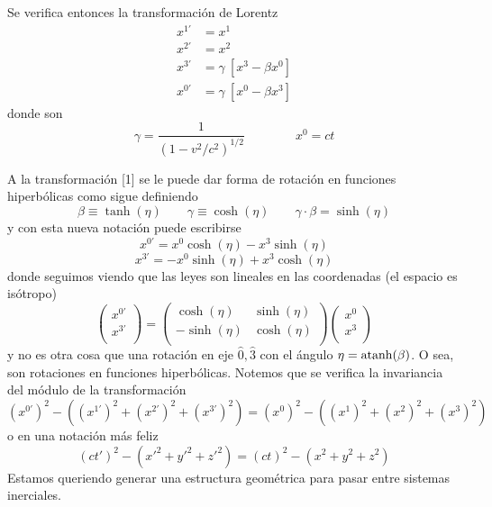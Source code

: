 \documentclass[10pt,oneside]{CBFT_book}
\begin{document}
Se verifica entonces la transformación de Lorentz
\begin{align*}
	x^{1'} &= x^1  \\
	x^{2'} &= x^2  \\
	x^{3'} &= \gamma \: [ x^3 - \beta x^0]  \\
	x^{0'} &= \gamma \: [ x^0 - \beta x^3] 
\end{align*}
donde son 
\[
	\gamma = \frac{1}{(1 - v^2/c^2)^{1/2}} \qquad \qquad x^0 = ct 
\]

A la transformación [1] se le puede dar forma de rotación en funciones hiperbólicas como sigue
definiendo
\[
	\beta \equiv \tanh(\eta) \qquad \gamma \equiv \cosh(\eta) \qquad 
	\gamma\cdot \beta = \sinh(\eta)
\]
y con esta nueva notación puede escribirse
\[
	x^{0'} = x^0 \cosh( \eta ) - x^3 \sinh( \eta )
\]
\[
	x^{3'} = -x^0 \sinh( \eta ) + x^3 \cosh( \eta )
\]
donde seguimos viendo que las leyes son lineales en las coordenadas (el espacio es isótropo)
\[
	\begin{pmatrix}
	 x^{0'} \\
	 x^{3'} \\
	\end{pmatrix}
	=
	\begin{pmatrix}
	\cosh( \eta ) & \sinh( \eta ) \\
	-\sinh( \eta ) & \cosh( \eta ) \\
	\end{pmatrix}
	\begin{pmatrix}
	 x^{0} \\
	 x^{3} \\
	\end{pmatrix}
\]
y no es otra cosa  que una rotación en eje $\hat{0}, \hat{3}$ con el ángulo $\eta = \mathrm{ atanh }( \beta )$.
O sea, son rotaciones en funciones hiperbólicas.
Notemos que se verifica la invariancia del módulo de la transformación
\[
	(x^{0'})^2 -  ( (x^{1'})^2  + (x^{2'})^2 + (x^{3'})^2 ) =
		(x^{0})^2 -  ( (x^{1})^2  + (x^{2})^2 + (x^{3})^2 ) 
\]
o en una notación más feliz
\[
	(ct')^2 - ( x'^2 + y'^2 + z'^2 ) = (ct)^2 - ( x^2 + y^2 + z^2 )
\]
Estamos queriendo generar una estructura geométrica para pasar entre sistemas inerciales.
\end{document}
